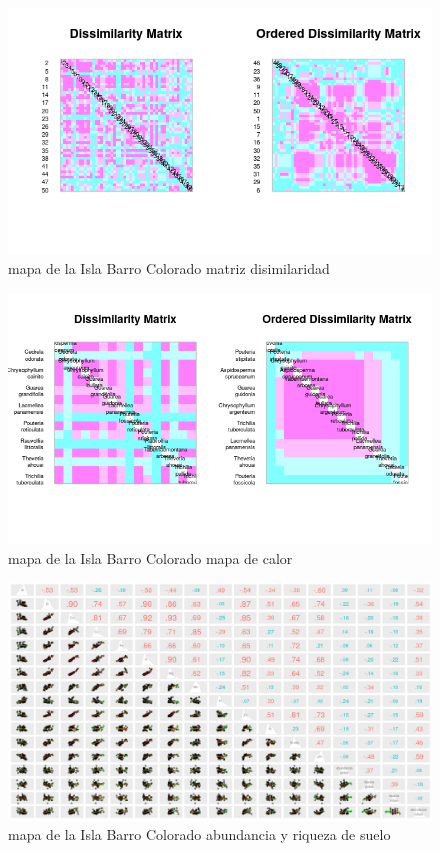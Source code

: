 \documentclass[11pt,]{article}
\begin{document}
\begin{figure}
\centering
\includegraphics[width=1.00000\textwidth]{matriz_similaridad.png}
\caption{mapa de la Isla Barro Colorado matriz disimilaridad
\label{fig:bci_map}}
\end{figure}

\begin{figure}
\centering
\includegraphics[width=1.00000\textwidth]{mapadecalor.png}
\caption{mapa de la Isla Barro Colorado mapa de calor
\label{fig:bci_map}}
\end{figure}

\begin{figure}
\centering
\includegraphics[width=1.00000\textwidth]{matriz_correlacion_suelo_abun_riq_spearman.png}
\caption{mapa de la Isla Barro Colorado abundancia y riqueza de suelo
\label{fig:bci_map}}
\end{figure}
\end{document}
